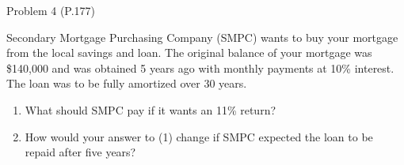 \documentclass[ignorenonframetext,]{beamer}
\providecommand{\tightlist}{%
\setlength{\itemsep}{0pt}\setlength{\parskip}{0pt}}
\begin{document}
\begin{frame}{Problem 4 (P.177)}

\small
Secondary Mortgage Purchasing Company (SMPC) wants to buy your mortgage
from the local savings and loan. The original balance of your mortgage
was \$140,000 and was obtained 5 years ago with monthly payments at 10\%
interest. The loan was to be fully amortized over 30 years.

\begin{enumerate}
\def\labelenumi{\arabic{enumi}.}
\tightlist
\item
  What should SMPC pay if it wants an 11\% return?
\item
  How would your answer to (1) change if SMPC expected the loan to be
  repaid after five years?
\end{enumerate}

\end{frame}
\end{document}
